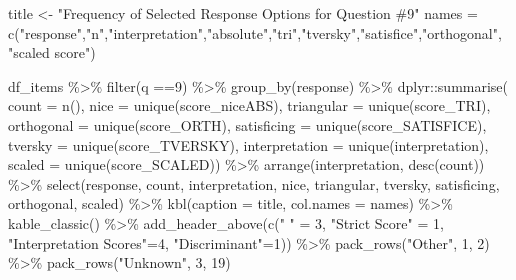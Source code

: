 \documentclass[
  letterpaper,
  DIV=11,
  numbers=noendperiod]{scrreprt}
\newenvironment{Shaded}{\begin{snugshade}}{\end{snugshade}}
\newcommand{\AttributeTok}[1]{\textcolor[rgb]{0.40,0.45,0.13}{#1}}
\newcommand{\DecValTok}[1]{\textcolor[rgb]{0.68,0.00,0.00}{#1}}
\newcommand{\FunctionTok}[1]{\textcolor[rgb]{0.28,0.35,0.67}{#1}}
\newcommand{\NormalTok}[1]{\textcolor[rgb]{0.00,0.23,0.31}{#1}}
\newcommand{\OtherTok}[1]{\textcolor[rgb]{0.00,0.23,0.31}{#1}}
\newcommand{\SpecialCharTok}[1]{\textcolor[rgb]{0.37,0.37,0.37}{#1}}
\newcommand{\StringTok}[1]{\textcolor[rgb]{0.13,0.47,0.30}{#1}}
\begin{document}
\begin{Shaded}
\begin{Highlighting}[]
\NormalTok{title }\OtherTok{\textless{}{-}} \StringTok{"Frequency of Selected Response Options for Question \#9"}
\NormalTok{names }\OtherTok{=} \FunctionTok{c}\NormalTok{(}\StringTok{"response"}\NormalTok{,}\StringTok{"n"}\NormalTok{,}\StringTok{"interpretation"}\NormalTok{,}\StringTok{"absolute"}\NormalTok{,}\StringTok{"tri"}\NormalTok{,}\StringTok{"tversky"}\NormalTok{,}\StringTok{"satisfice"}\NormalTok{,}\StringTok{"orthogonal"}\NormalTok{, }\StringTok{"scaled score"}\NormalTok{)}

\NormalTok{df\_items }\SpecialCharTok{\%\textgreater{}\%} \FunctionTok{filter}\NormalTok{(q }\SpecialCharTok{==}\DecValTok{9}\NormalTok{) }\SpecialCharTok{\%\textgreater{}\%} \FunctionTok{group\_by}\NormalTok{(response) }\SpecialCharTok{\%\textgreater{}\%}
\NormalTok{  dplyr}\SpecialCharTok{::}\FunctionTok{summarise}\NormalTok{( }\AttributeTok{count =} \FunctionTok{n}\NormalTok{(),}
                    \AttributeTok{nice =} \FunctionTok{unique}\NormalTok{(score\_niceABS),}
                    \AttributeTok{triangular =} \FunctionTok{unique}\NormalTok{(score\_TRI),}
                    \AttributeTok{orthogonal =}  \FunctionTok{unique}\NormalTok{(score\_ORTH),}
                    \AttributeTok{satisficing =}  \FunctionTok{unique}\NormalTok{(score\_SATISFICE),}
                    \AttributeTok{tversky =} \FunctionTok{unique}\NormalTok{(score\_TVERSKY),}
                    \AttributeTok{interpretation =} \FunctionTok{unique}\NormalTok{(interpretation),}
                    \AttributeTok{scaled =} \FunctionTok{unique}\NormalTok{(score\_SCALED)) }\SpecialCharTok{\%\textgreater{}\%}
  \FunctionTok{arrange}\NormalTok{(interpretation, }\FunctionTok{desc}\NormalTok{(count)) }\SpecialCharTok{\%\textgreater{}\%}
  \FunctionTok{select}\NormalTok{(response, count, interpretation, nice,}
\NormalTok{         triangular, tversky, satisficing, orthogonal, scaled) }\SpecialCharTok{\%\textgreater{}\%}
  \FunctionTok{kbl}\NormalTok{(}\AttributeTok{caption =}\NormalTok{ title, }\AttributeTok{col.names =}\NormalTok{ names) }\SpecialCharTok{\%\textgreater{}\%}  \FunctionTok{kable\_classic}\NormalTok{() }\SpecialCharTok{\%\textgreater{}\%}
  \FunctionTok{add\_header\_above}\NormalTok{(}\FunctionTok{c}\NormalTok{(}\StringTok{" "} \OtherTok{=} \DecValTok{3}\NormalTok{, }\StringTok{"Strict Score"} \OtherTok{=} \DecValTok{1}\NormalTok{, }\StringTok{"Interpretation Scores"}\OtherTok{=}\DecValTok{4}\NormalTok{, }\StringTok{"Discriminant"}\OtherTok{=}\DecValTok{1}\NormalTok{)) }\SpecialCharTok{\%\textgreater{}\%}
  \FunctionTok{pack\_rows}\NormalTok{(}\StringTok{"Other"}\NormalTok{, }\DecValTok{1}\NormalTok{, }\DecValTok{2}\NormalTok{) }\SpecialCharTok{\%\textgreater{}\%}
  \FunctionTok{pack\_rows}\NormalTok{(}\StringTok{"Unknown"}\NormalTok{, }\DecValTok{3}\NormalTok{, }\DecValTok{19}\NormalTok{)}
\end{Highlighting}
\end{Shaded}
\end{document}
